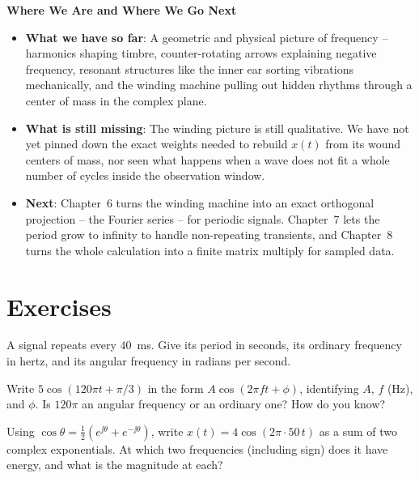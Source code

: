 \begin{connectionbox}
\textbf{Where We Are and Where We Go Next}
\begin{itemize}
  \item \textbf{What we have so far}: A geometric and physical picture of frequency -- harmonics
  shaping timbre, counter-rotating arrows explaining negative frequency, resonant structures like
  the inner ear sorting vibrations mechanically, and the winding machine pulling out hidden rhythms
  through a center of mass in the complex plane.
  \item \textbf{What is still missing}: The winding picture is still qualitative. We have not yet
  pinned down the exact weights needed to rebuild $x(t)$ from its wound centers of mass, nor seen
  what happens when a wave does not fit a whole number of cycles inside the observation window.
  \item \textbf{Next}: Chapter~6 turns the winding machine into an exact orthogonal projection --
  the Fourier series -- for periodic signals. Chapter~7 lets the period grow to infinity to handle
  non-repeating transients, and Chapter~8 turns the whole calculation into a finite matrix multiply
  for sampled data.
\end{itemize}
\end{connectionbox}

\section{Exercises}

\begin{exercise}
A signal repeats every $40$~ms. Give its period in seconds, its ordinary frequency in
hertz, and its angular frequency in radians per second.
\end{exercise}

\begin{exercise}
Write $5\cos(120\pi t + \pi/3)$ in the form $A\cos(2\pi f t + \phi)$, identifying
$A$, $f$ (Hz), and $\phi$. Is $120\pi$ an angular frequency or an ordinary one? How
do you know?
\end{exercise}

\begin{exercise}
Using $\cos\theta = \tfrac12(e^{\jj\theta}+e^{-\jj\theta})$, write
$x(t)=4\cos(2\pi\cdot 50\,t)$ as a sum of two complex exponentials. At which two
frequencies (including sign) does it have energy, and what is the magnitude at each?
\end{exercise}

